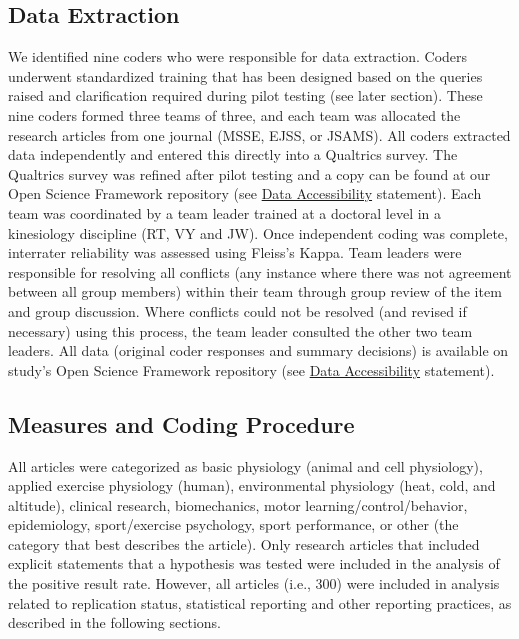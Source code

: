 \documentclass[]{cik}%
\begin{document}
\hypertarget{data-extraction}{%
\subsection{Data Extraction}\label{data-extraction}}

We identified nine coders who were responsible for data extraction.
Coders underwent standardized training that has been designed based on
the queries raised and clarification required during pilot testing (see
later section). These nine coders formed three teams of three, and each
team was allocated the research articles from one journal (MSSE, EJSS,
or JSAMS). All coders extracted data independently and entered this
directly into a Qualtrics survey. The Qualtrics survey was refined after
pilot testing and a copy can be found at our Open Science Framework
repository (see \protect\hyperlink{data}{Data Accessibility} statement).
Each team was coordinated by a team leader trained at a doctoral level
in a kinesiology discipline (RT, VY and JW). Once independent coding was
complete, interrater reliability was assessed using Fleiss's Kappa. Team
leaders were responsible for resolving all conflicts (any instance where
there was not agreement between all group members) within their team
through group review of the item and group discussion. Where conflicts
could not be resolved (and revised if necessary) using this process, the
team leader consulted the other two team leaders. All data (original
coder responses and summary decisions) is available on study's Open
Science Framework repository (see \protect\hyperlink{data}{Data
Accessibility} statement).

\hypertarget{measures-and-coding-procedure}{%
\subsection{Measures and Coding
Procedure}\label{measures-and-coding-procedure}}

All articles were categorized as basic physiology (animal and cell
physiology), applied exercise physiology (human), environmental
physiology (heat, cold, and altitude), clinical research, biomechanics,
motor learning/control/behavior, epidemiology, sport/exercise
psychology, sport performance, or other (the category that best
describes the article). Only research articles that included explicit
statements that a hypothesis was tested were included in the analysis of
the positive result rate. However, all articles (i.e., 300) were
included in analysis related to replication status, statistical
reporting and other reporting practices, as described in the following
sections.
\end{document}
